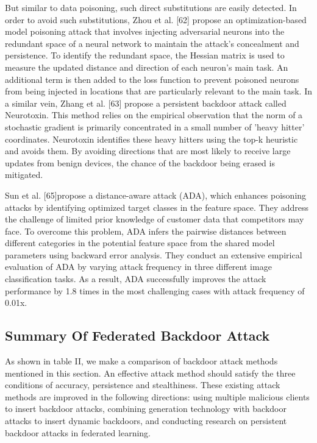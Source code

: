 But similar to data poisoning, such direct substitutions
are easily detected. In order to avoid such substitutions,
Zhou et al. [62] propose an optimization-based model
poisoning attack that involves injecting adversarial
neurons into the redundant space of a neural network to
maintain the attack's concealment and persistence. To
identify the redundant space, the Hessian matrix is used
to measure the updated distance and direction of each
neuron's main task. An additional term is then added
to the loss function to prevent poisoned neurons from
being injected in locations that are particularly relevant
to the main task. In a similar vein, Zhang et al. [63]
propose a persistent backdoor attack called Neurotoxin.
This method relies on the empirical observation that the
norm of a stochastic gradient is primarily concentrated in
a small number of 'heavy hitter' coordinates. Neurotoxin
identifies these heavy hitters using the top-k heuristic and
avoids them. By avoiding directions that are most likely
to receive large updates from benign devices, the chance
of the backdoor being erased is mitigated. 

Sun et al. [65]propose a distance-aware attack (ADA),
which enhances poisoning attacks by identifying optimized
target classes in the feature space. They address the
challenge of limited prior knowledge of customer data that
competitors may face. To overcome this problem, ADA
infers the pairwise distances between different categories
in the potential feature space from the shared model
parameters using backward error analysis. They conduct
an extensive empirical evaluation of ADA by varying
attack frequency in three different image classification
tasks. As a result, ADA successfully improves the attack
performance by 1.8 times in the most challenging cases
with attack frequency of 0.01x.  

\subsection{Summary Of Federated Backdoor Attack}
As shown in table II, we make a comparison of backdoor
attack methods mentioned in this section. An effective
attack method should satisfy the three conditions of
accuracy, persistence and stealthiness. These existing
attack methods are improved in the following directions:
using multiple malicious clients to insert backdoor attacks,
combining generation technology with backdoor attacks
to insert dynamic backdoors, and conducting research on
persistent backdoor attacks in federated learning.  

